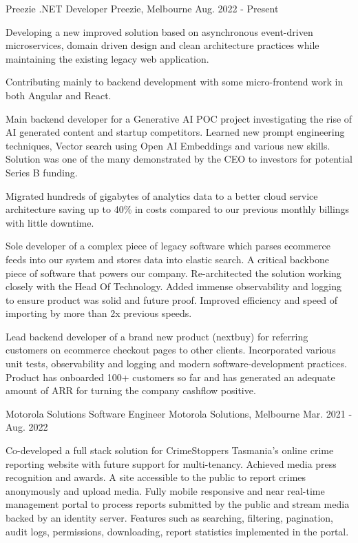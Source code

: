 

\vspace{-0.5\baselineskip}
\begin{cventries}
  \cventry
    {Preezie}
    {.NET Developer}
    {Preezie, Melbourne}
    {Aug. 2022 - Present}
    {
      \begin{cvitems}
        \item {Developing a new improved solution based on asynchronous event-driven microservices, domain driven design and clean architecture practices while maintaining the existing legacy web application.}
        \item {Contributing mainly to backend development with some micro-frontend work in both Angular and React.}
        \item {Main backend developer for a Generative AI POC project investigating the rise of AI generated content and startup competitors. Learned new prompt engineering techniques, Vector search using Open AI Embeddings and various new skills. Solution was one of the many demonstrated by the CEO to investors for potential Series B funding.}
		\item {Migrated hundreds of gigabytes of analytics data to a better cloud service architecture saving up to 40\% in costs compared to our previous monthly billings with little downtime.}
        \item {Sole developer of a complex piece of legacy software which parses ecommerce feeds into our system and stores data into elastic search. A critical backbone piece of software that powers our company. Re-architected the solution working closely with the Head Of Technology. Added immense observability and logging to ensure product was solid and future proof. Improved efficiency and speed of importing by more than 2x previous speeds.}
        \item {Lead backend developer of a brand new product (nextbuy) for referring customers on ecommerce checkout pages to other clients. Incorporated various unit tests, observability and logging and modern software-development practices. Product has onboarded 100+ customers so far and has generated an adequate amount of ARR for turning the company cashflow positive.}
	  \end{cvitems}
    }
  \cventry
    {Motorola Solutions}
    {Software Engineer}
    {Motorola Solutions, Melbourne}
    {Mar. 2021 - Aug. 2022}
    {
      \begin{cvitems}
        \item {Co-developed a full stack solution for CrimeStoppers Tasmania's online crime reporting website with future support for multi-tenancy. Achieved media press recognition and awards. A site accessible to the public to report crimes anonymously and upload media. Fully mobile responsive and near real-time management portal to process reports submitted by the public and stream media backed by an identity server. Features such as searching, filtering, pagination, audit logs, permissions, downloading, report statistics implemented in the portal.}

\end{cvitems}}
\end{cventries}
